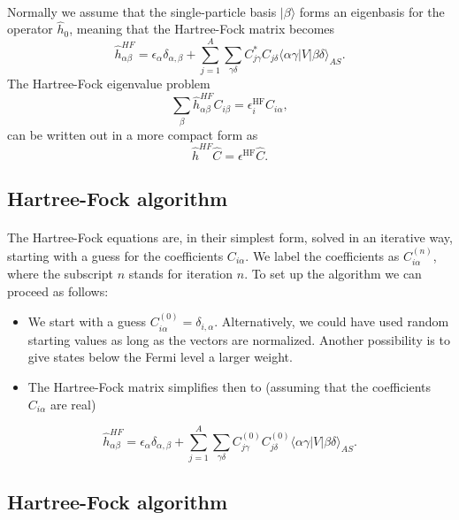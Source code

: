 \documentclass[%
twoside,                 %
final,                   %
10pt]{article}
\begin{document}
\paragraph{}
Normally we assume that the single-particle basis $|\beta\rangle$ forms an eigenbasis for the operator
$\hat{h}_0$, meaning that the Hartree-Fock matrix becomes  
\[
\hat{h}_{\alpha\beta}^{HF}=\epsilon_{\alpha}\delta_{\alpha,\beta}+
\sum_{j=1}^A\sum_{\gamma\delta} C^*_{j\gamma}C_{j\delta}\langle \alpha\gamma|V|\beta\delta\rangle_{AS}.
\]
The Hartree-Fock eigenvalue problem
\[
\sum_{\beta}\hat{h}_{\alpha\beta}^{HF}C_{i\beta}=\epsilon_i^{\mathrm{HF}}C_{i\alpha},
\]
can be written out in a more compact form as
\[
\hat{h}^{HF}\hat{C}=\epsilon^{\mathrm{HF}}\hat{C}. 
\]



\subsection*{Hartree-Fock algorithm}

\paragraph{}
The Hartree-Fock equations are, in their simplest form, solved in an iterative way, starting with a guess for the
coefficients $C_{i\alpha}$. We label the coefficients as $C_{i\alpha}^{(n)}$, where the subscript $n$ stands for iteration $n$.
To set up the algorithm we can proceed as follows:

\begin{itemize}
 \item We start with a guess $C_{i\alpha}^{(0)}=\delta_{i,\alpha}$. Alternatively, we could have used random starting values as long as the vectors are normalized. Another possibility is to give states below the Fermi level a larger weight.

 \item The Hartree-Fock matrix simplifies then to (assuming that the coefficients $C_{i\alpha} $  are real)
\end{itemize}

\noindent
\[
\hat{h}_{\alpha\beta}^{HF}=\epsilon_{\alpha}\delta_{\alpha,\beta}+
\sum_{j = 1}^A\sum_{\gamma\delta} C_{j\gamma}^{(0)}C_{j\delta}^{(0)}\langle \alpha\gamma|V|\beta\delta\rangle_{AS}.
\]



\subsection*{Hartree-Fock algorithm}
\end{document}
